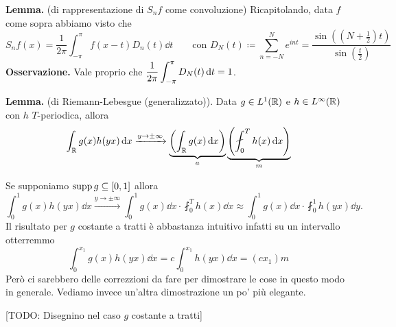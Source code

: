 %
%




\textbf{Lemma.} (di rappresentazione di $S_n f$ come convoluzione)
Ricapitolando, data $f$ come sopra abbiamo visto che
$$
S_n f(x) = \frac{1}{2\pi} \int_{-\pi}^\pi f(x - t) D_n(t) \dd t
\qquad
\text{con }
D_N(t) \coloneqq \sum_{n=-N}^N e^{int} = \frac{\sin\left(\left(N + \frac{1}{2}\right)t\right)}{\sin \left(\frac{t}{2}\right)}
$$
\textbf{Osservazione.}
Vale proprio che $\displaystyle \frac{1}{2\pi} \int_{-\pi}^\pi D_N(t) \,\mathrm{d} t = 1$.

\textbf{Lemma.} (di Riemann-Lebesgue (generalizzato)).
Data $g \in L^1(\mathbb R)$ e $h \in L^\infty(\mathbb R)$ con $h$ $T$-periodica, allora
$$
\int_\R g(x) h(yx) \dd x \xrightarrow{y \to \pm \infty}
\underbrace{\left(\int_\R g(x) \dd x \right)}_a
\underbrace{\left(\fint_0^T h(x) \dd x \right)}_m
$$

Se supponiamo $\operatorname{supp} g \subseteq [0, 1]$ allora
%
$$
	 \int_0^1 g(x) h(yx) \dd x \xrightarrow{y \to \pm \infty} \int_0^1 g(x) \dd x \cdot \fint_0^T h(x) \dd x \approx \int_0^1 g(x) \dd x \cdot \fint_0^1 h(yx) \dd y.
$$
%
Il risultato per $g$ costante a tratti è abbastanza intuitivo infatti su un intervallo otterremmo
$$
\int_0^{x_1} g(x) h(yx) \dd x = c \int_0^{x_1} h(yx) \dd x = (c x_1) m
$$
Però ci sarebbero delle correzzioni da fare per dimostrare le cose in questo modo in generale. Vediamo invece un'altra dimostrazione un po' più elegante.

[TODO: Disegnino nel caso $g$ costante a tratti]

